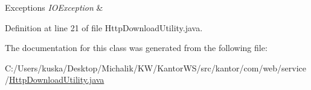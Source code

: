 \begin{DoxyExceptions}{Exceptions}
{\em I\+O\+Exception} & \\
\hline
\end{DoxyExceptions}


Definition at line 21 of file Http\+Download\+Utility.\+java.



The documentation for this class was generated from the following file\+:\begin{DoxyCompactItemize}
\item 
C\+:/\+Users/kuska/\+Desktop/\+Michalik/\+K\+W/\+Kantor\+W\+S/src/kantor/com/web/service/\hyperlink{_http_download_utility_8java}{Http\+Download\+Utility.\+java}\end{DoxyCompactItemize}
